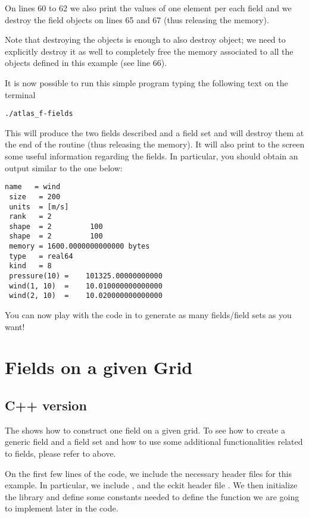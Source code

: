 On lines 60 to 62 we also print the values of one element 
per each field and we destroy the field objects on lines 
65 and 67 (thus releasing the memory).

Note that destroying the  objects 
is enough to also destroy  object;
we need to explicitly destroy it as well to completely 
free the memory associated to all the objects defined 
in this example (see line 66).

It is now possible to run this simple program typing
the following text on the terminal
%
\begin{lstlisting}[style=BashStyle]
./atlas_f-fields
\end{lstlisting}
% 
This will produce the two fields described and a field 
set and will destroy them at the end of the routine 
(thus releasing the memory). It will also print to 
the screen some useful information regarding the fields.
In particular, you should obtain an output similar to 
the one below:
%
\begin{lstlisting}[style=BashStyle]
 name   = wind
 size   = 200
 units  = [m/s]
 rank   = 2
 shape  = 2         100
 shape  = 2         100
 memory = 1600.0000000000000 bytes
 type   = real64
 kind   = 8
 pressure(10) =    101325.00000000000     
 wind(1, 10)  =    10.010000000000000     
 wind(2, 10)  =    10.020000000000000
\end{lstlisting}
% 
You can now play with the code in  
to generate as many fields/field sets as you want! 




\section{Fields on a given Grid}
\label{sect:grid-fields}

\subsection{C++ version}
The  shows how to construct one field
on a given grid. To see how to create a generic field and 
a field set and how to use some additional functionalities 
related to fields, please refer to 
above. 
%

%
On the first few lines of the code, we include the necessary 
header files for this example. In particular, we include 
,  and the eckit header file 
. We then initialize the \Atlas library 
and define some constants needed to define the function 
we are going to implement later in the code. 

